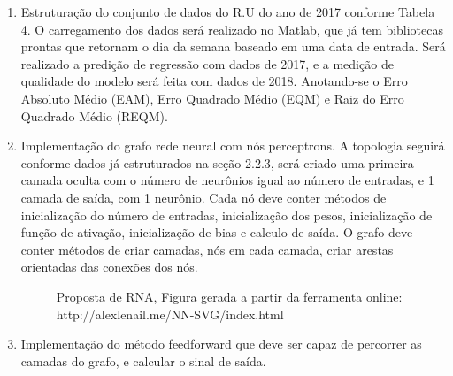 \documentclass[	12pt, Times, openright, twoside, a4paper, english, brazil]{abntex2}
\begin{document}
    \begin{enumerate}
    
    \item Estruturação do conjunto de dados do R.U do ano de 2017 conforme Tabela 4. O carregamento dos dados será realizado no Matlab, que já tem bibliotecas prontas que retornam o dia da semana baseado em uma data de entrada. Será realizado a predição de regressão com dados de 2017, e a medição de qualidade do modelo será feita com dados de 2018. Anotando-se o Erro Absoluto Médio (EAM), Erro Quadrado Médio (EQM) e Raiz do Erro Quadrado Médio (REQM).
    
    \item Implementação do grafo rede neural com nós perceptrons. A topologia seguirá conforme dados já estruturados na seção 2.2.3, será criado uma primeira camada oculta com o número de neurônios igual ao número de entradas, e 1 camada de saída, com 1 neurônio. Cada nó deve conter métodos de inicialização do número de entradas, inicialização dos pesos, inicialização de função de ativação, inicialização de bias e calculo de saída. O grafo deve conter métodos de criar camadas, nós em cada camada, criar arestas orientadas das conexões dos nós.
    \begin{figure}[!ht]
          	\caption{Proposta de RNA, Figura gerada a partir da ferramenta online: http://alexlenail.me/NN-SVG/index.html}
    \end{figure}

    \item Implementação do método feedforward que deve ser capaz de percorrer as camadas do grafo, e calcular o sinal de saída.


\end{enumerate}
\end{document}
